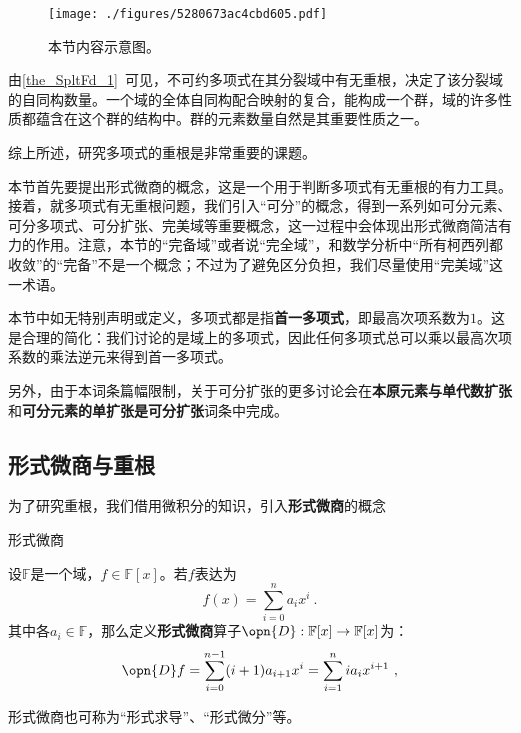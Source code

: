 



\begin{figure}[ht]
\centering
\texttt{[image: ./figures/5280673ac4cbd605.pdf]}
\caption{本节内容示意图。} \label{fig_SprbEx_1}
\end{figure}


由\autoref{the_SpltFd_1}~可见，不可约多项式在其分裂域中有无重根，决定了该分裂域的自同构数量。一个域的全体自同构配合映射的复合，能构成一个群，域的许多性质都蕴含在这个群的结构中。群的元素数量自然是其重要性质之一。

综上所述，研究多项式的重根是非常重要的课题。

本节首先要提出形式微商的概念，这是一个用于判断多项式有无重根的有力工具。接着，就多项式有无重根问题，我们引入“可分”的概念，得到一系列如可分元素、可分多项式、可分扩张、完美域等重要概念，这一过程中会体现出形式微商简洁有力的作用。注意，本节的“完备域”或者说“完全域”，和数学分析中“所有柯西列都收敛”的“完备”不是一个概念；不过为了避免区分负担，我们尽量使用“完美域”这一术语。

本节中如无特别声明或定义，多项式都是指\textbf{首一多项式}，即最高次项系数为$1$。这是合理的简化：我们讨论的是域上的多项式，因此任何多项式总可以乘以最高次项系数的乘法逆元来得到首一多项式。

另外，由于本词条篇幅限制，关于可分扩张的更多讨论会在\textbf{本原元素与单代数扩张}和\textbf{可分元素的单扩张是可分扩张}词条中完成。

\subsection{形式微商与重根}

为了研究重根，我们借用微积分的知识，引入\textbf{形式微商}的概念

\begin{definition}{形式微商}\label{def_SprbEx_1}

设$\mathbb{F}$是一个域，$f\in\mathbb{F}[x]$。若$f$表达为
\begin{equation}
f(x) = \sum_{i=0}^n a_ix^i~.
\end{equation}
其中各$a_i\in\mathbb{F}$，那么定义\textbf{形式微商}算子$\opn{D}:\mathbb{F}[x]\to\mathbb{F}[x]$为：
\begin{equation}
\opn{D}f = \sum_{i=0}^{n-1} (i+1)a_{i+1}x^i = \sum_{i=1}^{n} ia_{i}x^{i+1}~,
\end{equation}

形式微商也可称为“形式求导”、“形式微分”等。

\end{definition}

